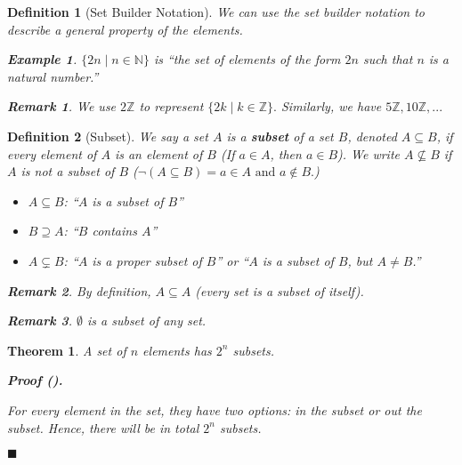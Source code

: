 \documentclass[12pt,a4paper]{article}
\newcounter{nprf}[subsection]
\newtheorem{thm}{Theorem}[subsection]
\newtheorem{df}{Definition}[subsection]
\newtheorem{eg}{Example}[subsection]
\newtheorem*{rmk}{\indent Remark}
\newenvironment*{prf}{\par\indent\textbf{\textit{Proof} (\stepcounter{nprf}\thenprf). }\par}{\par\hfill $\blacksquare$\par}
\def\Z{{\mathbb{Z}}}
\def\N{{\mathbb{N}}}
\begin{document}
\begin{df}[Set Builder Notation]
	We can use the set builder notation to describe a general property of the elements.
	\begin{eg}
		$\{2n\mid n\in\N\}$ is ``the set of elements of the form $2n$ such that $n$ is a natural number.''	
	\end{eg}
	\begin{rmk} We use $2\Z$ to represent $\{2k\mid k\in\Z\}.$ Similarly, we have $5\Z, 10\Z,...$\end{rmk}
\end{df}
\begin{df}[Subset]
	We say a set $A$ is a \textbf{subset} of a set $B$, denoted $A\subseteq B$, if every element of $A$ is an element of $B$ (If $a\in A$, then $a\in B$). We write $A\nsubseteq B$ if $A$ is not a subset of $B$ ($\neg(A\subseteq B)=a\in A\text{ and }a\notin B.$)
	\begin{itemize}
		\item $A\subseteq B$: ``$A$ is a subset of $B$''
		\item $B\supseteq A$: ``$B$ contains $A$''
		\item $A\subsetneq B$: ``$A$ is a proper subset of $B$'' or ``$A$ is a subset of $B$, but $A\neq B$.''
	\end{itemize}
	\begin{rmk}By definition, $A\subseteq A$ (every set is a subset of itself). \end{rmk}
	\begin{rmk}$\emptyset$ is a subset of any set.\end{rmk}
\end{df}
\begin{thm}
	A set of $n$ elements has $2^n$ subsets.
	\begin{prf}
		For every element in the set, they have two options: in the subset or out the subset. Hence, there will be in total $2^n$ subsets.	
	\end{prf}
\end{thm}
\end{document}
